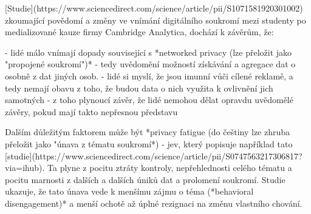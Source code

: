 [Studie](https://www.sciencedirect.com/science/article/pii/S1071581920301002) zkoumající povědomí a změny ve vnímání digitálního soukromí mezi studenty po medializované kauze firmy Cambridge Analytica, dochází k závěrům, že:

- lidé málo vnímají dopady související s *networked privacy (lze přeložit jako "propojené soukromí")* - tedy uvědomění možností získávání a agregace dat o osobně z dat jiných osob.
- lidé si myslí, že jsou imunní vůči cílené reklamě, a tedy nemají obavu z toho, že budou data o nich využita k ovlivnění jich samotných
- z toho plynoucí závěr, že lidé nemohou dělat opravdu uvědomělé závěry, pokud mají takto nepřesnou představu

Dalším důležitým faktorem může být *privacy fatigue (do češtiny lze zhruba přeložit jako "únava z tématu soukromí*) - jev, který popisuje například tato [studie](https://www.sciencedirect.com/science/article/pii/S0747563217306817?via=ihub). Ta plyne z pocitu ztráty kontroly, nepřehlednosti celého tématu a pocitu marnosti z dalších a dalších úniků dat a prolomení soukromí. Studie ukazuje, že tato únava vede k menšímu zájmu o téma (*behavioral disengagement)* a menší ochotě až úplné rezignaci na změnu vlastního chování.
